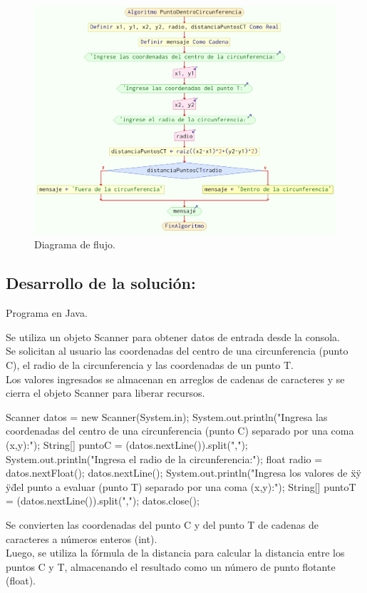 \begin{figure}[h!]
    \centering
    \includegraphics[width=1\linewidth]{LaTeX//latex-imagenes/Captura de pantalla 2023-11-23 150737.png}
    \caption{Diagrama de flujo.}
    \label{fig:enter-label}
\end{figure}
\subsection{\textbf{Desarrollo de la solución:}}
Programa en Java.
\newline
    
Se utiliza un objeto Scanner para obtener datos de entrada desde la consola.\\ Se solicitan al usuario las coordenadas del centro de una circunferencia (punto C), el radio de la circunferencia y las coordenadas de un punto T. \\
    Los valores ingresados se almacenan en arreglos de cadenas de caracteres y se cierra el objeto Scanner para liberar recursos.
\newline
    \begin{javaCode}
        Scanner datos = new Scanner(System.in);
        System.out.println("Ingresa las coordenadas del centro de una circunferencia (punto C) separado por una coma (x,y):");
        String[] puntoC = (datos.nextLine()).split(",");
        System.out.println("Ingresa el radio de la circunferencia:");
        float radio = datos.nextFloat();
        datos.nextLine();
        System.out.println("Ingresa los valores de \"x\" y \"y\" del punto a evaluar (punto T) separado por una coma (x,y):");
        String[] puntoT = (datos.nextLine()).split(",");
        datos.close();
    \end{javaCode} 
Se convierten las coordenadas del punto C y del punto T de cadenas de caracteres a números enteros (int). \\
    Luego, se utiliza la fórmula de la distancia para calcular la distancia entre los puntos C y T, almacenando el resultado como un número de punto flotante (float).
    

